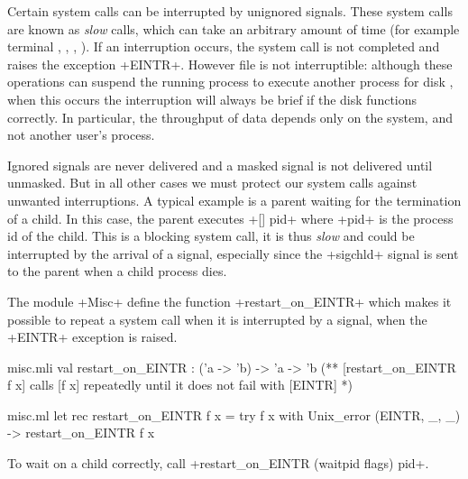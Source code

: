Certain system calls can be interrupted by unignored signals. These
system calls are known as \emph{slow} calls, which can take an
arbitrary amount of time (for example terminal \io,
, , \etc).  If
an interruption occurs, the system call is not completed and raises
the exception \ml+EINTR+.  However file \io{} is not interruptible:
although these operations can suspend the running process to execute
another process for disk \io{}, when this occurs the interruption will
always be brief if the disk functions correctly.  In particular, the
throughput of data depends only on the system, and not another user's
process.

Ignored signals are never delivered and a masked signal is not
delivered until unmasked. But in all other cases we must protect our
system calls against unwanted interruptions. A typical example is a
parent waiting for the termination of a child.  In this case, the
parent executes  \ml+[] pid+ where \ml+pid+ is the
process id of the child.  This is a blocking system call, it is thus
\emph{slow} and could be interrupted by the arrival of a signal,
especially since the \ml+sigchld+ signal is sent to the parent when a
child process dies.

The module \ml+Misc+ define the function \ml+restart_on_EINTR+ which
makes it possible to repeat a system call when it is interrupted by a
signal, \ie{} when the \ml+EINTR+ exception is raised.
%
\begin{codefile}{misc.mli}
val restart_on_EINTR : ('a -> 'b) -> 'a -> 'b
(** [restart_on_EINTR f x] calls [f x] repeatedly until it does not fail
with [EINTR] *)
\end{codefile}
%
\begin{listingcodefile}{misc.ml}
let rec restart_on_EINTR f x = 
  try f x with Unix_error (EINTR, _, _) -> restart_on_EINTR f x
\end{listingcodefile}
To wait on a child correctly, call
\ml+restart_on_EINTR (waitpid flags) pid+.

